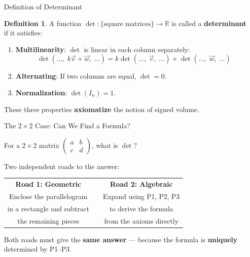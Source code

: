 \documentclass[10pt]{beamer}
\theoremstyle{definition}
\newtheorem{defi}{Definition}[section]
\newcommand{\x}[1]{\alert{\textbf{#1}}}
\begin{document}
\begin{frame}{Definition of Determinant}

\begin{defi}
A function $\det \colon \{\text{square matrices}\} \to \mathbb{R}$ is called a \x{determinant} if it satisfies:

\vspace{0.2cm}
\begin{enumerate}
\item[\textbf{P1.}] \textbf{Multilinearity}: $\det$ is linear in each column separately:
$$
\det(\ldots,\; k\vec{v} + \vec{w},\; \ldots) = k\det(\ldots,\;\vec{v},\;\ldots) + \det(\ldots,\;\vec{w},\;\ldots)
$$
\item[\textbf{P2.}] \textbf{Alternating}: If two columns are equal, $\det = 0$.
\item[\textbf{P3.}] \textbf{Normalization}: $\det(I_n) = 1$.
\end{enumerate}
\end{defi}

\vfill
These three properties \x{axiomatize} the notion of signed volume.

\end{frame}


\begin{frame}{The $2 \times 2$ Case: Can We Find a Formula?}

For a $2 \times 2$ matrix $\begin{pmatrix} a & b \\ c & d \end{pmatrix}$, what is $\det$?

\vfill

Two independent roads to the answer:

\vfill

\begin{center}
\begin{tabular}{cp{1cm}c}
\textbf{Road 1: Geometric} & & \textbf{Road 2: Algebraic} \\[6pt]
Enclose the parallelogram & & Expand using P1, P2, P3 \\
in a rectangle and subtract & & to derive the formula \\
the remaining pieces & & from the axioms directly
\end{tabular}
\end{center}

\vfill

Both roads must give the \x{same answer} — because the formula is \x{uniquely} determined by P1--P3.

\end{frame}
\end{document}
